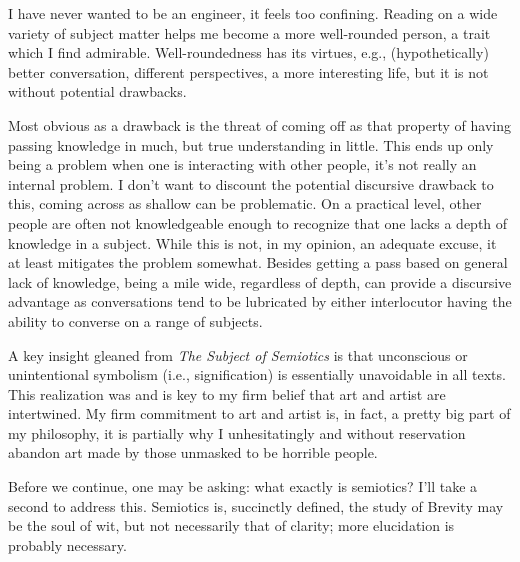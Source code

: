 \documentclass[../butidigress.tex]{subfiles}
\begin{document}
I have never wanted to be  an engineer, it feels too confining.
Reading on a wide variety of subject matter helps me become a more well-rounded person, a trait which I find admirable.
Well-roundedness has its virtues, e.g., (hypothetically) better conversation, different perspectives, a more interesting life, but it is not without potential drawbacks.

Most obvious as a drawback is the threat of coming off as  that property of having passing knowledge in much, but true understanding in little.
This ends up only being a problem when one is interacting with other people, it's not really an internal problem.
I don't want to discount the potential discursive drawback to this, coming across as shallow can be problematic.
On a practical level, other people are often not knowledgeable enough to recognize that one lacks a depth of knowledge in a subject.
While this is not, in my opinion, an adequate excuse, it at least mitigates the problem somewhat.
Besides getting a pass based on general lack of knowledge, being a mile wide, regardless of depth, can provide a discursive advantage as conversations tend to be lubricated by either interlocutor having the ability to converse on a range of subjects.

A key insight gleaned from \textit{The Subject of Semiotics} is that unconscious or unintentional symbolism (i.e., signification) is essentially unavoidable in all texts.
This realization was and is key to my firm belief that art and artist are intertwined.
My firm commitment to art and artist is, in fact, a pretty big part of my philosophy, it is partially why I unhesitatingly and without reservation abandon art made by those unmasked to be horrible people.

Before we continue, one may be asking: what exactly is semiotics? I'll take a second to address this.
Semiotics is, succinctly defined, the study of 
Brevity may be the soul of wit, but not necessarily that of clarity; more elucidation is probably necessary.
\end{document}
